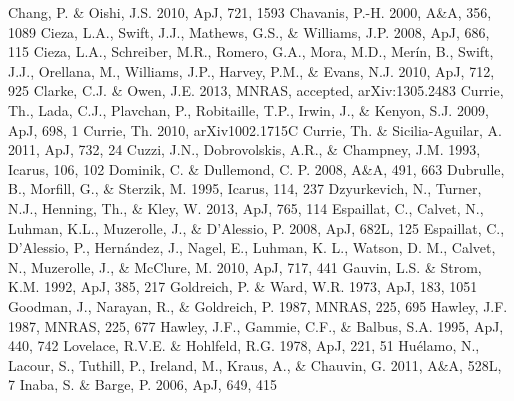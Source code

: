 \documentclass[apj]{emulateapj}
\begin{document}
\begin{thebibliography}{}
 Chang, P. \& Oishi, J.S. 2010, ApJ, 721, 1593
 Chavanis, P.-H. 2000, A\&A, 356, 1089
 Cieza, L.A., Swift, J.J., Mathews, G.S., \& Williams, J.P. 2008, ApJ, 686, 115
 Cieza, L.A., Schreiber, M.R., Romero, G.A., Mora, M.D., Mer\'in, B., Swift, J.J., 
  Orellana, M., Williams, J.P., Harvey, P.M., \& Evans, N.J. 2010, ApJ, 712, 925
 Clarke, C.J. \& Owen, J.E. 2013, MNRAS, accepted, arXiv:1305.2483
 Currie, Th., Lada, C.J., Plavchan, P.,  Robitaille, T.P., Irwin, J., \& Kenyon, S.J. 2009, ApJ, 698, 1
 Currie, Th. 2010, arXiv1002.1715C	
 Currie, Th. \& Sicilia-Aguilar, A. 2011, ApJ, 732, 24
 Cuzzi, J.N., Dobrovolskis, A.R., \& Champney, J.M. 1993, Icarus, 106, 102
 Dominik, C. \& Dullemond, C. P. 2008, A\&A, 491, 663
 Dubrulle, B., Morfill, G., \& Sterzik, M. 1995, Icarus, 114, 237
 Dzyurkevich, N., Turner, N.J., Henning, Th., \& Kley, W. 2013, ApJ, 765, 114
 Espaillat, C., Calvet, N., Luhman, K.L., Muzerolle, J., \& D'Alessio, P. 2008, ApJ, 682L, 125
 Espaillat, C., D'Alessio, P., Hern\'andez, J., Nagel, E., Luhman, K. L., Watson, D. M., Calvet, N., Muzerolle, J., \& McClure, M. 2010, ApJ, 717, 441
 Gauvin, L.S. \& Strom, K.M. 1992, ApJ, 385, 217
 Goldreich, P. \& Ward, W.R. 1973, ApJ, 183, 1051
 Goodman, J., Narayan, R., \& Goldreich, P. 1987, MNRAS, 225, 695
 Hawley, J.F. 1987, MNRAS, 225, 677
 Hawley, J.F., Gammie, C.F., \& Balbus, S.A. 1995, ApJ, 440, 742
 Lovelace, R.V.E. \& Hohlfeld, R.G. 1978, ApJ, 221, 51
 Hu\'elamo, N., Lacour, S., Tuthill, P., Ireland, M.,  Kraus, A., \& Chauvin, G. 2011, A\&A, 528L, 7
 Inaba, S. \& Barge, P. 2006, ApJ, 649, 415

\end{thebibliography}
\end{document}
